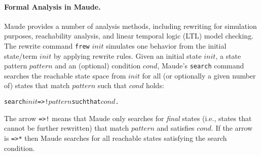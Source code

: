  \paragraph{Formal Analysis in Maude.} 
Maude provides a number of  analysis methods,
including rewriting for simulation purposes, reachability analysis,
and linear temporal logic (LTL) model checking.
The rewrite command \texttt{frew} $\mathit{init}$ simulates one
behavior from the initial state/term $\mathit{init}$ by applying
rewrite rules.  Given an initial state $\mathit{init}$, a state pattern
 $\mathit{pattern}$ and an (optional) condition $\mathit{cond}$,
 Maude's  \texttt{search}
 command searches the  reachable state space from $\mathit{init}$ for
 all (or optionally a given number of) states that match
 $\mathit{pattern}$ such that 
 $\mathit{cond}$ holds:   
 
\small
\begin{alltt}
  search \(\mathit{init}\)  =>!  \(\mathit{pattern}\) such that \(\mathit{cond}\) .
\end{alltt}
\normalsize 

\noindent The arrow  \texttt{=>!} means that Maude only searches for 
 \emph{final} states (i.e., states that cannot be further rewritten)
 that match $\mathit{pattern}$ and satisfies $\mathit{cond}$. If the
 arrow  is  \texttt{=>*} then Maude searches for all
 reachable states satisfying the search condition. 



